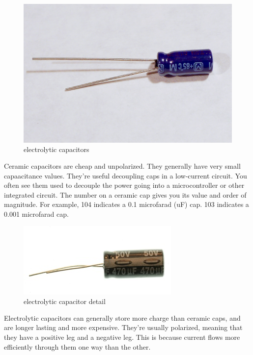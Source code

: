 \begin{figure}[!htb]
     \centering
     \includegraphics[scale=0.3]{img/components/caps_electrolytic.jpg}
     \caption{electrolytic capacitors}
     \label{electrolytic capacitors}
\end{figure}

Ceramic capacitors are cheap and unpolarized. They generally have very small capaacitance values. They're useful decoupling caps in a low-current circuit. You often see them used to decouple the power going into a microcontroller or other integrated circuit.
The number on a ceramic cap gives you its value and order of magnitude. For example, 104 indicates a 0.1 microfarad (uF) cap. 103 indicates a 0.001 microfarad cap. 

\begin{figure}[!htb]
     \centering
     \includegraphics[scale=0.3]{img/components/cap_electrolytic_detail.jpg}
     \caption{electrolytic capacitor detail}
     \label{electrolytic capacitor detail}
\end{figure}


Electrolytic capacitors can generally store more charge than ceramic caps, and are longer lasting and more expensive. They're usually polarized, meaning that they have a positive leg and a negative leg. This is because current flows more efficiently through them one way than the other. 

